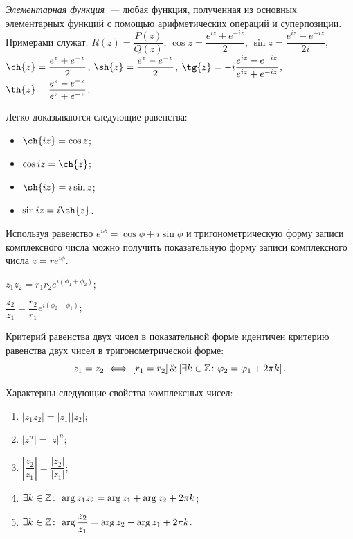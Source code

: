 \begin{definition}
\textit{Элементарная функция~---} любая функция, полученная из основных элементарных функций с
помощью арифметических операций и суперпозиции. Примерами служат: \(R(z) = \dfrac{P(z)}{Q(z)}\),
\(\cos{z} = \dfrac{e^{iz} + e^{-iz}}{2}\), \(\sin{z} = \dfrac{e^{iz} - e^{-iz}}{2i}\), \(\ch{z} =
\dfrac{e^{z} + e^{-z}}{2}\), \(\sh{z} = \dfrac{e^{z} - e^{-z}}{2}\), \(\tg{z} = -i\dfrac{e^{iz} -
e^{-iz}}{e^{iz} + e^{-iz}}\), \(\th{z} = \dfrac{e^z - e^{-z}}{e^z + e^{-z}}\).
\end{definition}

\begin{note}
Легко доказываются следующие равенства:
\begin{itemize}
\item \(\ch{iz} = \cos{z}\);
\item \(\cos{iz} = \ch{z}\);
\item \(\sh{iz} = i\sin{z}\);
\item \(\sin{iz} = i\sh{z}\).
\end{itemize}
\end{note}



Используя равенство \(e^{i\phi} = \cos{\phi} + i\sin{\phi}\) и тригонометрическую форму записи
комплексного числа можно получить показательную форму записи комплексного числа \(z =
re^{i\phi}\).
\begin{properties}
\item \(z_1z_2 = r_1r_2e^{i(\phi_1 + \phi_2)}\);
\item \(\dfrac{z_2}{z_1} = \dfrac{r_2}{r_1}e^{i(\phi_2 - \phi_1)}\);
\item \label{3:kriterion_equality}Критерий равенства двух чисел в показательной форме идентичен
критерию равенства двух чисел в тригонометрической форме:
\[
    z_1 = z_2 \iff \left[r_1 = r_2\right] \& \left[\exists k \in \mathbb{Z} \colon \varphi_2 = \varphi_1 + 2\pi
        k\right].
\]
\end{properties}

\begin{corollary}
Характерны следующие свойства комплексных чисел:
\begin{enumerate}
\item \(|z_1 z_2| = |z_1||z_2|\);
\item \(|z^n| = |z|^n\);
\item \(\left|\dfrac{z_2}{z_1}\right| = \dfrac{|z_2|}{|z_1|}\);
\item \(\exists k \in \mathbb{Z} \colon \, \arg{z_1 z_2} = \arg{z_1} + \arg{z_2} + 2\pi k\);
\item \(\exists k \in \mathbb{Z} \colon \, \arg{\dfrac{z_2}{z_1}} = \arg{z_2} - \arg{z_1} + 2\pi k\).
\end{enumerate}
\end{corollary}

